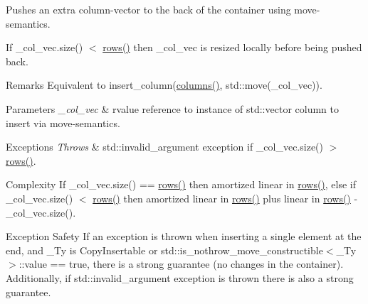Pushes an extra column-\/vector to the back of the container using move-\/semantics. 

If {\ttfamily \+\_\+col\+\_\+vec.\+size() $<$ \hyperlink{classcrsc_1_1dynamic__matrix_a5d167a31d3be0ac09d3abdf57a11832d}{rows()}} then {\ttfamily \+\_\+col\+\_\+vec} is resized locally before being pushed back.

\begin{DoxyRemark}{Remarks}
Equivalent to {\ttfamily insert\+\_\+column(\hyperlink{classcrsc_1_1dynamic__matrix_a43d52d7663b24b2175add500c7650d63}{columns()}, std\+::move(\+\_\+col\+\_\+vec))}. 
\end{DoxyRemark}

\begin{DoxyParams}{Parameters}
{\em \+\_\+col\+\_\+vec} & rvalue reference to instance of {\ttfamily std\+::vector} column to insert via move-\/semantics. \\
\hline
\end{DoxyParams}

\begin{DoxyExceptions}{Exceptions}
{\em Throws} & {\ttfamily std\+::invalid\+\_\+argument} exception if {\ttfamily \+\_\+col\+\_\+vec.\+size() $>$ \hyperlink{classcrsc_1_1dynamic__matrix_a5d167a31d3be0ac09d3abdf57a11832d}{rows()}}. \\
\hline
\end{DoxyExceptions}
\begin{DoxyParagraph}{Complexity}
If {\ttfamily \+\_\+col\+\_\+vec.\+size() == \hyperlink{classcrsc_1_1dynamic__matrix_a5d167a31d3be0ac09d3abdf57a11832d}{rows()}} then amortized linear in {\ttfamily \hyperlink{classcrsc_1_1dynamic__matrix_a5d167a31d3be0ac09d3abdf57a11832d}{rows()}}, else if {\ttfamily \+\_\+col\+\_\+vec.\+size() $<$ \hyperlink{classcrsc_1_1dynamic__matrix_a5d167a31d3be0ac09d3abdf57a11832d}{rows()}} then amortized linear in {\ttfamily \hyperlink{classcrsc_1_1dynamic__matrix_a5d167a31d3be0ac09d3abdf57a11832d}{rows()}} plus linear in {\ttfamily \hyperlink{classcrsc_1_1dynamic__matrix_a5d167a31d3be0ac09d3abdf57a11832d}{rows()} -\/ \+\_\+col\+\_\+vec.\+size()}. 
\end{DoxyParagraph}
\begin{DoxyParagraph}{Exception Safety}
If an exception is thrown when inserting a single element at the {\ttfamily end}, and {\ttfamily \+\_\+\+Ty} is {\ttfamily Copy\+Insertable} or {\ttfamily std\+::is\+\_\+nothrow\+\_\+move\+\_\+constructible$<$\+\_\+\+Ty$>$\+::value == true}, there is a strong guarantee (no changes in the container). Additionally, if {\ttfamily std\+::invalid\+\_\+argument} exception is thrown there is also a strong guarantee. 
\end{DoxyParagraph}
